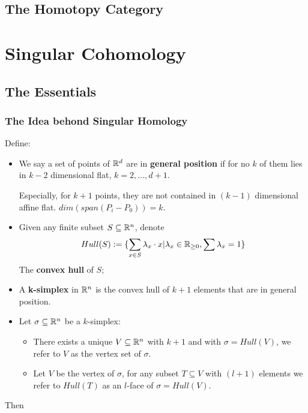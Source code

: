 \documentclass[Total.tex]{subfiles}
\begin{document}
			\section{The Homotopy Category}
	\chapter{Singular Cohomology}
		\section{The Essentials}
			\subsection{The Idea behond Singular Homology}
					\begin{Def}
					Define:
					\begin{itemize}
						\item We say a set of points of $\mathbb{R}^d$ are in \textbf{general position} if for no $k$ of them lies in $k-2$ dimensional flat, $k=2,\dots,d+1$.
						
						Especially, for $k+1$ points, they are not contained in $(k-1)$ dimensional affine flat. $dim(span(P_i-P_0))=k$.
						\item Given any finite subset $S\subseteq \mathbb{R}^n$, denote
						\begin{gather*}
							Hull(S):=\{\sum_{x\in S} \lambda_x\cdot x|\lambda_x\in \mathbb{R}_{\geq 0},\sum \lambda_x=1\}
						\end{gather*}
						The \textbf{convex hull} of $S$;
						\item A \textbf{k-simplex} in $\mathbb{R}^n$ is the convex hull of $k+1$ elements that are in general position.
						\item Let $\sigma\subseteq \mathbb{R}^n$ be a $k$-simplex:
						\begin{itemize}
							\item There exists a unique $V\subseteq\mathbb{R}^n$ with $k+1$ and with $\sigma=Hull(V)$, we refer to $V$ as the vertex set of $\sigma$. 
							\item Let $V$ be the vertex of $\sigma$, for any subset $T\subseteq V$ with $(l+1)$ elements we refer to $Hull(T)$ as an $l$-face of $\sigma=Hull(V)$.
						\end{itemize}
					\end{itemize}
				\end{Def}
				Then
\end{document}
